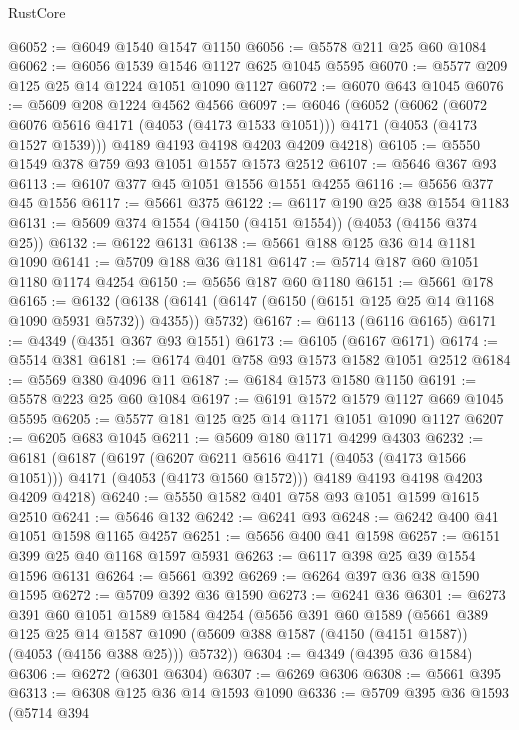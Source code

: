 \begin{lexlean}{RustCore}
\begin{coremodule}
@6052 := @6049 @1540 @1547 @1150
@6056 := @5578 @211 @25 @60 @1084
@6062 := @6056 @1539 @1546 @1127 @625 @1045 @5595
@6070 := @5577 @209 @125 @25 @14 @1224 @1051 @1090 @1127
@6072 := @6070 @643 @1045
@6076 := @5609 @208 @1224 @4562 @4566
@6097 := @6046
    (@6052
      (@6062
        (@6072 @6076 @5616 @4171 (@4053 (@4173 @1533 @1051)))
        @4171
        (@4053 (@4173 @1527 @1539)))
      @4189
      @4193
      @4198
      @4203
      @4209
      @4218)
@6105 := @5550 @1549 @378 @759 @93 @1051 @1557 @1573 @2512
@6107 := @5646 @367 @93
@6113 := @6107 @377 @45 @1051 @1556 @1551 @4255
@6116 := @5656 @377 @45 @1556
@6117 := @5661 @375
@6122 := @6117 @190 @25 @38 @1554 @1183
@6131 := @5609 @374 @1554 (@4150 (@4151 @1554)) (@4053 (@4156 @374 @25))
@6132 := @6122 @6131
@6138 := @5661 @188 @125 @36 @14 @1181 @1090
@6141 := @5709 @188 @36 @1181
@6147 := @5714 @187 @60 @1051 @1180 @1174 @4254
@6150 := @5656 @187 @60 @1180
@6151 := @5661 @178
@6165 := @6132
    (@6138 (@6141 (@6147 (@6150 (@6151 @125 @25 @14 @1168 @1090 @5931 @5732)) @4355)) @5732)
@6167 := @6113 (@6116 @6165)
@6171 := @4349 (@4351 @367 @93 @1551)
@6173 := @6105 (@6167 @6171)
@6174 := @5514 @381
@6181 := @6174 @401 @758 @93 @1573 @1582 @1051 @2512
@6184 := @5569 @380 @4096 @11
@6187 := @6184 @1573 @1580 @1150
@6191 := @5578 @223 @25 @60 @1084
@6197 := @6191 @1572 @1579 @1127 @669 @1045 @5595
@6205 := @5577 @181 @125 @25 @14 @1171 @1051 @1090 @1127
@6207 := @6205 @683 @1045
@6211 := @5609 @180 @1171 @4299 @4303
@6232 := @6181
    (@6187
      (@6197
        (@6207 @6211 @5616 @4171 (@4053 (@4173 @1566 @1051)))
        @4171
        (@4053 (@4173 @1560 @1572)))
      @4189
      @4193
      @4198
      @4203
      @4209
      @4218)
@6240 := @5550 @1582 @401 @758 @93 @1051 @1599 @1615 @2510
@6241 := @5646 @132
@6242 := @6241 @93
@6248 := @6242 @400 @41 @1051 @1598 @1165 @4257
@6251 := @5656 @400 @41 @1598
@6257 := @6151 @399 @25 @40 @1168 @1597 @5931
@6263 := @6117 @398 @25 @39 @1554 @1596 @6131
@6264 := @5661 @392
@6269 := @6264 @397 @36 @38 @1590 @1595
@6272 := @5709 @392 @36 @1590
@6273 := @6241 @36
@6301 := @6273
    @391
    @60
    @1051
    @1589
    @1584
    @4254
    (@5656
      @391
      @60
      @1589
      (@5661
        @389
        @125
        @25
        @14
        @1587
        @1090
        (@5609 @388 @1587 (@4150 (@4151 @1587)) (@4053 (@4156 @388 @25)))
        @5732))
@6304 := @4349 (@4395 @36 @1584)
@6306 := @6272 (@6301 @6304)
@6307 := @6269 @6306
@6308 := @5661 @395
@6313 := @6308 @125 @36 @14 @1593 @1090
@6336 := @5709
    @395
    @36
    @1593
    (@5714
      @394

\end{coremodule}
\end{lexlean}
